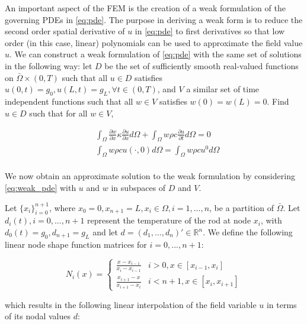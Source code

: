 \documentclass[letterpaper, 10 pt, conference]{ieeeconf/ieeeconf}
\newcommand*{\R}{\mathbb{R}}
\begin{document}
An important aspect of the FEM is the creation of a weak formulation of the
governing PDEs in \cref{eq:pde}. The purpose in deriving a weak form is to
reduce the second order spatial derivative of $u$ in \cref{eq:pde} to first
derivatives so that low order (in this case, linear) polynomials can be used to
approximate the field value $u$. We can construct a weak formulation of \cref{eq:pde} with the same set of
solutions in the following way: let $D$ be the set of sufficiently smooth 
real-valued functions on $\bar{\Omega} \times (0, T)$ such that all 
$u \in D$ satisfies $u(0, t) = g_0, u(L, t) = g_L, \forall t \in (0, T)$, 
and $V$ a similar set of time
independent functions such that all $w \in V$ satisfies $w(0) = w(L) = 0$. 
Find $u \in D$ such that for all $w \in V$,

\begin{equation}\label{eq:weak_pde}
    \begin{aligned}
        &\int_{\Omega} \frac{\partial w}{\partial x} \kappa \frac{\partial
        u}{\partial x} d \Omega + 
        \int_{\Omega} w \rho c \frac{\partial u}{\partial t} d \Omega = 0 \\
        &\int_{\Omega} w \rho c u(\cdot, 0) d \Omega =
        \int_{\Omega} w \rho c u^0 d \Omega \\
    \end{aligned}
\end{equation}

We now obtain an approximate solution to the weak formulation by considering
\cref{eq:weak_pde} with $u$ and $w$ in subspaces of $D$ and $V$.

Let $\{x_i\}_{i = 0}^{n +
1}$, where $x_0 = 0, x_{n+1} = L, x_i \in \Omega, i = 1,...,n$, be a partition of
$\bar\Omega$. Let $d_i(t), i = 0,...,n+1$ represent the
temperature of the rod at node $x_i$, with $d_0(t) = g_0, d_{n+1} = g_L$ and let $d = (d_1, ..., d_n)' \in
\R^n$. We define the following linear node shape function matrices for $i =
0,...,n+1$:

\begin{equation}
    N_i(x) = \begin{cases}
        \frac{x - x_{i - 1}}{x_i - x_{i - 1}} & i > 0, x \in [x_{i-1}, x_i] \\
        \frac{x_{i+1} - x}{x_{i+1} - x_{i}} & i < n+1, x \in [x_{i}, x_{i+1}] 
    \end{cases} 
\end{equation}

which results in the following linear interpolation of the field variable $u$ in
terms of its nodal values $d$:
\end{document}
